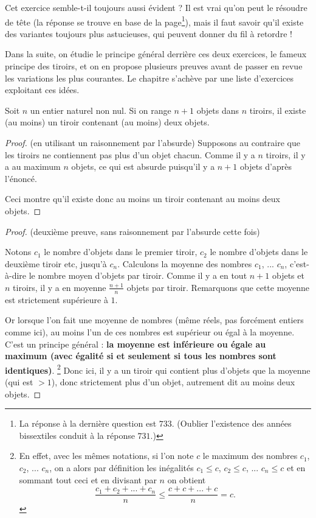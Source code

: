 \vspace{1em}
Cet exercice semble-t-il toujours aussi évident ? Il est vrai qu'on peut le résoudre de tête (la réponse se trouve en base de la page\footnote{La réponse à la dernière question est $733$. (Oublier l'existence des années bissextiles conduit à la réponse $731$.)}), mais il faut savoir qu'il existe des variantes toujours plus astucieuses, qui peuvent donner du fil à retordre !

 Dans la suite, on étudie le principe général  derrière ces deux exercices, le fameux \og principe des tiroirs\fg, et on en propose plusieurs preuves avant de passer en revue les variations les plus courantes. Le chapitre s'achève par une liste d'exercices exploitant ces idées.



\begin{proposition}\label{tiroirs1}
Soit $n$ un entier naturel non nul. Si on range $n+1$ objets dans $n$ tiroirs, il existe (au moins) un tiroir contenant (au moins) deux objets.
\end{proposition}

\begin{proof} (en utilisant un raisonnement par l'absurde)
Supposons au contraire que les tiroirs ne contiennent pas plus d'un objet chacun. Comme il y a $n$ tiroirs, il y a au maximum $n$ objets, ce qui est absurde puisqu'il y a $n+1$ objets d'après l'énoncé. 

Ceci montre qu'il existe donc au moins un tiroir contenant au moins deux objets.
\end{proof}

\begin{proof} (deuxième preuve, sans raisonnement par l'absurde cette fois)

Notons $c_1$ le nombre d'objets dans le premier tiroir, $c_2$ le nombre d'objets dans le deuxième tiroir etc, jusqu'à $c_n$. Calculons la moyenne des nombres $c_1$, ... $c_n$, c'est-à-dire le nombre moyen d'objets par tiroir.  Comme il y a en tout $n+1$ objets et $n$ tiroirs, il y a en moyenne $\frac{n+1}{n}$ objets par tiroir. Remarquons que cette moyenne est strictement supérieure à $1$.

Or lorsque l'on fait une moyenne de nombres (même réels, pas forcément entiers comme ici), au moins l'un de ces nombres est supérieur ou égal à la moyenne. C'est un principe général  : \textbf{la moyenne est inférieure ou égale au maximum (avec égalité si et seulement si tous les nombres sont identiques)}. \footnote{En effet, avec les mêmes notations, si l'on note $c$ le maximum des nombres $c_1$, $c_2$, ... $c_n$, on a alors par définition les inégalités $c_1\leq c$, $c_2\leq c$, ... $c_n\leq c$ et en sommant tout ceci et en divisant par $n$ on obtient
\[
\frac{c_1+c_2+...+c_n}{n} \leq \frac{c+c+...+c}{n} = c.\]}
Donc ici, il y a un tiroir qui contient plus d'objets que la moyenne (qui est $>1$), donc strictement plus d'un objet, autrement dit au moins deux objets.
\end{proof}

